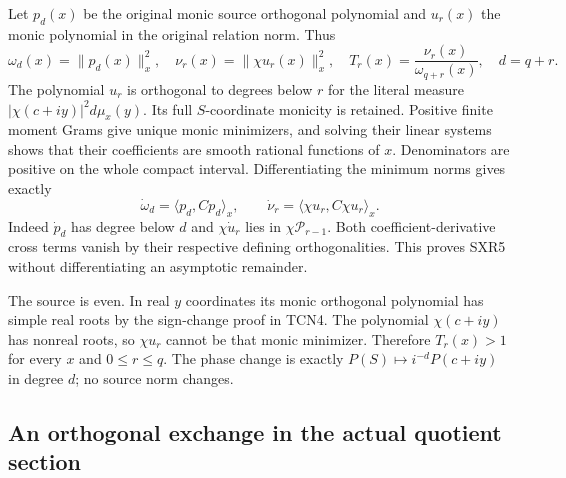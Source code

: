 Let $p_d(x)$ be the original monic source orthogonal polynomial and
$u_r(x)$ the monic polynomial in the original relation norm. Thus
\begin{equation}\tag{SXR4}
 \omega_d(x)=\|p_d(x)\|_x^2,\quad
 \nu_r(x)=\|\chi u_r(x)\|_x^2,\quad
 T_r(x)=\frac{\nu_r(x)}{\omega_{q+r}(x)},\quad d=q+r.
\end{equation}
The polynomial $u_r$ is orthogonal to degrees below $r$ for the
literal measure $|\chi(c+iy)|^2d\mu_x(y)$. Its full $S$-coordinate
monicity is retained. Positive finite moment Grams give unique monic
minimizers, and solving their linear systems shows that their
coefficients are smooth rational functions of $x$. Denominators
are positive on the whole compact interval. Differentiating the
minimum norms gives exactly
\begin{equation}\tag{SXR5}
 \dot\omega_d=\langle p_d,Cp_d\rangle_x,\qquad
 \dot\nu_r=\langle\chi u_r,C\chi u_r\rangle_x.
\end{equation}
Indeed $\dot p_d$ has degree below $d$ and $\chi\dot u_r$ lies
in $\chi\mathcal P_{r-1}$. Both coefficient-derivative cross terms
vanish by their respective defining orthogonalities. This proves
SXR5 without differentiating an asymptotic remainder.

The source is even. In real $y$ coordinates its monic orthogonal
polynomial has simple real roots by the sign-change proof in TCN4.
The polynomial $\chi(c+iy)$ has nonreal roots, so $\chi u_r$ cannot
be that monic minimizer. Therefore $T_r(x)>1$ for every $x$ and
$0\le r\le q$. The phase change is exactly
$P(S)\mapsto i^{-d}P(c+iy)$ in degree $d$; no source norm changes.

\subsection{An orthogonal exchange in the actual quotient section}

